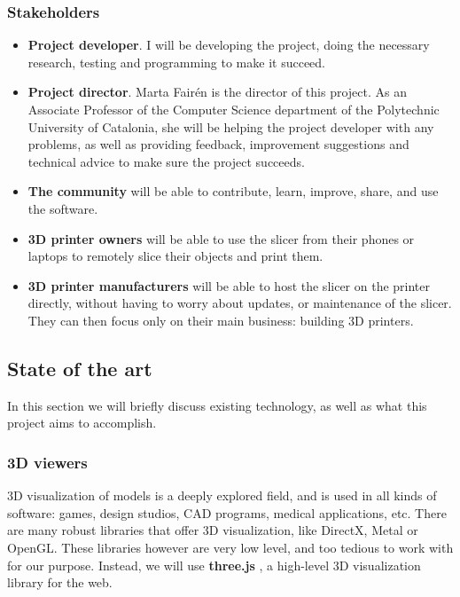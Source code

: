 \subsubsection{Stakeholders}
\begin{itemize}
    \item \textbf{Project developer}. I will be developing the project, doing the necessary research, testing and programming to make it succeed.
    \item \textbf{Project director}. Marta Fairén is the director of this project. As an Associate Professor of the Computer Science department of the Polytechnic University of Catalonia, she will be helping the project developer with any problems, as well as providing feedback, improvement suggestions and technical advice to make sure the project succeeds.
    \item \textbf{The community} will be able to contribute, learn, improve, share, and use the software.
    \item \textbf{3D printer owners}  will be able to use the slicer from their phones or laptops to remotely slice their objects and print them.
    \item \textbf{3D printer manufacturers} will be able to host the slicer on the printer directly, without having to worry about updates, or maintenance of the slicer. They can then focus only on their main business: building 3D printers.
\end{itemize}

\subsection{State of the art}
In this section we will briefly discuss existing technology, as well as what this project aims to accomplish.

\subsubsection{3D viewers}
3D visualization of models is a deeply explored field, and is used in all kinds of software: games, design studios, CAD programs, medical applications, etc. There are many robust libraries that offer 3D visualization, like DirectX, Metal or OpenGL. These libraries however are very low level, and too tedious to work with for our purpose. Instead, we will use \textbf{three.js} \cite{gh:threejs}, a high-level 3D visualization library for the web.

